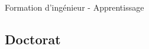 \documentclass[t,compress,mathserif,12pt,xcolor=dvipsnames]{beamer}
\begin{document}
\begin{frame}[t]{Formation d'ingénieur - Apprentissage}
\begin{figure}[htp]
    \centering
  \end{figure}


\end{frame}

\subsection{Doctorat}
\end{document}
